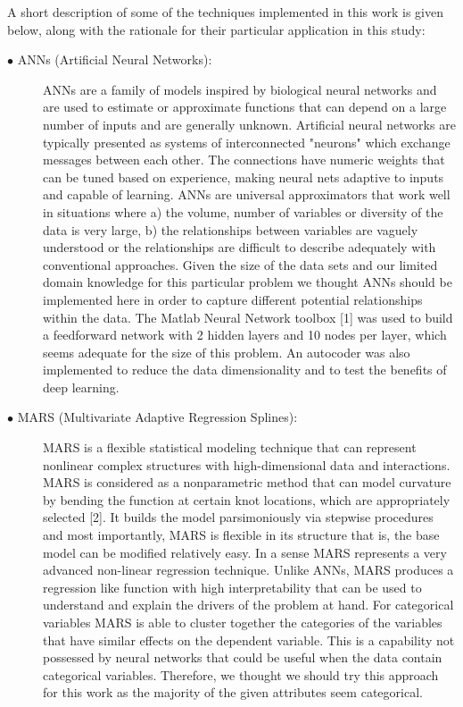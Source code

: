 \documentclass{article}
\begin{document}
A short description of some of the techniques implemented in this work is given below, along with the rationale for their particular application in this study:

\begin{description}
  \item[\hspace{0.75cm}$\bullet$ ANNs (Artificial Neural Networks):] ANNs are a family of models inspired by biological neural networks and are used to estimate or approximate functions that can depend on a large number of inputs and are generally unknown. Artificial neural networks are typically presented as systems of interconnected "neurons" which exchange messages between each other. The connections have numeric weights that can be tuned based on experience, making neural nets adaptive to inputs and capable of learning. ANNs are universal approximators that work well in situations where a) the volume, number of variables or diversity of the data is very large, b) the relationships between variables are vaguely understood or the relationships are difficult to describe adequately with conventional approaches. Given the size of the data sets and our limited domain knowledge for this particular problem we thought ANNs should be implemented here in order to capture different potential relationships within the data. The Matlab Neural Network toolbox [1] was used to build a feedforward network with 2 hidden layers and 10 nodes per layer, which seems adequate for the size of this problem. An autocoder was also implemented to reduce the data dimensionality and to test the benefits of deep learning. 
  \item[\hspace{0.75cm}$\bullet$ MARS (Multivariate Adaptive Regression Splines):] MARS is a flexible statistical modeling technique that can represent nonlinear complex structures with high-dimensional data and interactions. MARS is considered as a nonparametric method that can model curvature by bending the function at certain knot locations, which are appropriately selected [2]. It builds the model parsimoniously via stepwise procedures and most importantly, MARS is flexible in its structure that is, the base model can be modified relatively easy. In a sense MARS represents a very advanced non-linear regression technique. Unlike ANNs, MARS produces a regression like function with high interpretability that can be used to understand and explain the drivers of the problem at hand. For categorical variables MARS is able to cluster together the categories of the variables that have similar effects on the dependent variable. This is a capability not possessed by neural networks that could be useful when the data contain categorical variables. Therefore, we thought we should try this approach for this work as the majority of the given attributes seem categorical.


\end{description}
\end{document}
